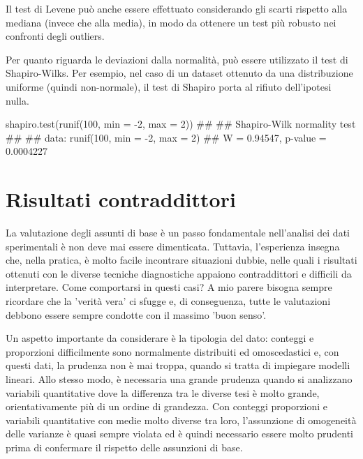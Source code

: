 \documentclass[a4paper,12pt,oneside]{book}
\newenvironment{Shaded}{\begin{snugshade}}{\end{snugshade}}
\newcommand{\DecValTok}[1]{#1}
\newcommand{\SpecialCharTok}[1]{#1}
\newcommand{\DocumentationTok}[1]{#1}
\newcommand{\FunctionTok}[1]{#1}
\newcommand{\AttributeTok}[1]{#1}
\newcommand{\NormalTok}[1]{#1}
\begin{document}
Il test di Levene può anche essere effettuato considerando gli scarti rispetto alla mediana (invece che alla media), in modo da ottenere un test più robusto nei confronti degli outliers.

Per quanto riguarda le deviazioni dalla normalità, può essere utilizzato il test di Shapiro-Wilks. Per esempio, nel caso di un dataset ottenuto da una distribuzione uniforme (quindi non-normale), il test di Shapiro porta al rifiuto dell'ipotesi nulla.

\begin{Shaded}
\begin{Highlighting}[]
\FunctionTok{shapiro.test}\NormalTok{(}\FunctionTok{runif}\NormalTok{(}\DecValTok{100}\NormalTok{, }\AttributeTok{min =} \SpecialCharTok{{-}}\DecValTok{2}\NormalTok{, }\AttributeTok{max =} \DecValTok{2}\NormalTok{))}
\DocumentationTok{\#\# }
\DocumentationTok{\#\#  Shapiro{-}Wilk normality test}
\DocumentationTok{\#\# }
\DocumentationTok{\#\# data:  runif(100, min = {-}2, max = 2)}
\DocumentationTok{\#\# W = 0.94547, p{-}value = 0.0004227}
\end{Highlighting}
\end{Shaded}

\hypertarget{risultati-contraddittori}{%
\section{Risultati contraddittori}\label{risultati-contraddittori}}

La valutazione degli assunti di base è un passo fondamentale nell'analisi dei dati sperimentali è non deve mai essere dimenticata. Tuttavia, l'esperienza insegna che, nella pratica, è molto facile incontrare situazioni dubbie, nelle quali i risultati ottenuti con le diverse tecniche diagnostiche appaiono contraddittori e difficili da interpretare. Come comportarsi in questi casi? A mio parere bisogna sempre ricordare che la 'verità vera' ci sfugge e, di conseguenza, tutte le valutazioni debbono essere sempre condotte con il massimo 'buon senso'.

Un aspetto importante da considerare è la tipologia del dato: conteggi e proporzioni difficilmente sono normalmente distribuiti ed omoscedastici e, con questi dati, la prudenza non è mai troppa, quando si tratta di impiegare modelli lineari. Allo stesso modo, è necessaria una grande prudenza quando si analizzano variabili quantitative dove la differenza tra le diverse tesi è molto grande, orientativamente più di un ordine di grandezza. Con conteggi proporzioni e variabili quantitative con medie molto diverse tra loro, l'assunzione di omogeneità delle varianze è quasi sempre violata ed è quindi necessario essere molto prudenti prima di confermare il rispetto delle assunzioni di base.
\end{document}

